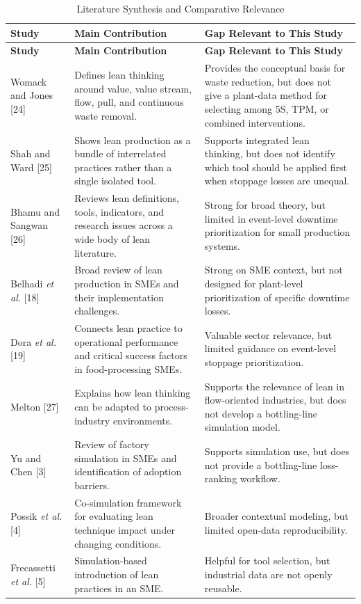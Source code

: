 \documentclass[12pt,a4paper]{article}
\begin{document}
\begin{longtable}{p{2.8cm}p{5.7cm}p{4.9cm}}
\caption{Literature Synthesis and Comparative Relevance}\\
\toprule
\textbf{Study} & \textbf{Main Contribution} & \textbf{Gap Relevant to This Study} \\
\midrule
\endfirsthead
\toprule
\textbf{Study} & \textbf{Main Contribution} & \textbf{Gap Relevant to This Study} \\
\midrule
\endhead
Womack and Jones [24] & Defines lean thinking around value, value stream, flow, pull, and continuous waste removal. & Provides the conceptual basis for waste reduction, but does not give a plant-data method for selecting among 5S, TPM, or combined interventions. \\
Shah and Ward [25] & Shows lean production as a bundle of interrelated practices rather than a single isolated tool. & Supports integrated lean thinking, but does not identify which tool should be applied first when stoppage losses are unequal. \\
Bhamu and Sangwan [26] & Reviews lean definitions, tools, indicators, and research issues across a wide body of lean literature. & Strong for broad theory, but limited in event-level downtime prioritization for small production systems. \\
Belhadi \emph{et al.} [18] & Broad review of lean production in SMEs and their implementation challenges. & Strong on SME context, but not designed for plant-level prioritization of specific downtime losses. \\
Dora \emph{et al.} [19] & Connects lean practice to operational performance and critical success factors in food-processing SMEs. & Valuable sector relevance, but limited guidance on event-level stoppage prioritization. \\
Melton [27] & Explains how lean thinking can be adapted to process-industry environments. & Supports the relevance of lean in flow-oriented industries, but does not develop a bottling-line simulation model. \\
Yu and Chen [3] & Review of factory simulation in SMEs and identification of adoption barriers. & Supports simulation use, but does not provide a bottling-line loss-ranking workflow. \\
Possik \emph{et al.} [4] & Co-simulation framework for evaluating lean technique impact under changing conditions. & Broader contextual modeling, but limited open-data reproducibility. \\
Frecassetti \emph{et al.} [5] & Simulation-based introduction of lean practices in an SME. & Helpful for tool selection, but industrial data are not openly reusable. \\

\end{longtable}
\end{document}
